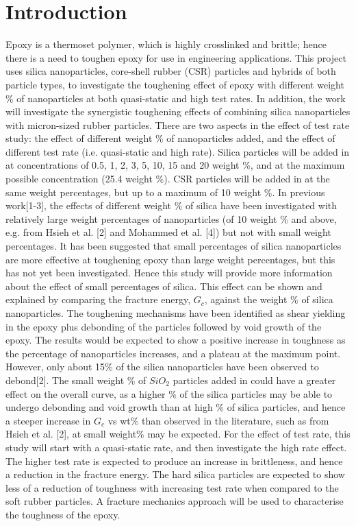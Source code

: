 \section{Introduction}
Epoxy is a thermoset polymer, which is highly crosslinked and brittle; hence there is a need to toughen epoxy for use in engineering applications. This project uses silica nanoparticles, core-shell rubber (CSR) particles and hybrids of both particle types, to investigate the toughening effect of epoxy with different weight \% of nanoparticles at both quasi-static and high test rates. In addition, the work will investigate the synergistic toughening effects of combining silica nanoparticles with micron-sized rubber particles. 
There are two aspects in the effect of test rate study: the effect of different weight \% of nanoparticles added, and the effect of different test rate (i.e. quasi-static and high rate). Silica particles will be added in at concentrations of 0.5, 1, 2, 3, 5, 10, 15 and 20 weight \%, and at the maximum possible concentration (25.4 weight \%). CSR particles will be added in at the same weight percentages, but up to a maximum of 10 weight \%. In previous work[1-3], the effects of different weight \% of silica have been investigated with relatively large weight percentages of nanoparticles (of 10 weight \% and above, e.g. from Hsieh et al. [2] and Mohammed et al. [4]) but not with small weight percentages. It has been suggested that small percentages of silica nanoparticles are more effective at toughening epoxy than large weight percentages, but this has not yet been investigated. Hence this study will provide more information about the effect of small percentages of silica. This effect can be shown and explained by comparing the fracture energy, $G_c$, against the weight \% of silica nanoparticles. The toughening mechanisms have been identified as shear yielding in the epoxy plus debonding of the particles followed by void growth of the epoxy. The results would be expected to show a positive increase in toughness as the percentage of nanoparticles increases, and a plateau at the maximum point. However, only about 15\% of the silica nanoparticles have been observed to debond[2]. The small weight \% of $SiO_2$ particles added in could have a greater effect on the overall curve, as a higher \% of the silica particles may be able to undergo debonding and void growth than at high \% of silica particles, and hence a steeper increase in $G_c$ vs wt\% than observed in the literature, such as from Hsieh et al. [2], at small weight\% may be expected.
For the effect of test rate, this study will start with a quasi-static rate, and then investigate the high rate effect. The higher test rate is expected to produce an increase in brittleness, and hence a reduction in the fracture energy. The hard silica particles are expected to show less of a reduction of toughness with increasing test rate when compared to the soft rubber particles. A fracture mechanics approach will be used to characterise the toughness of the epoxy. 